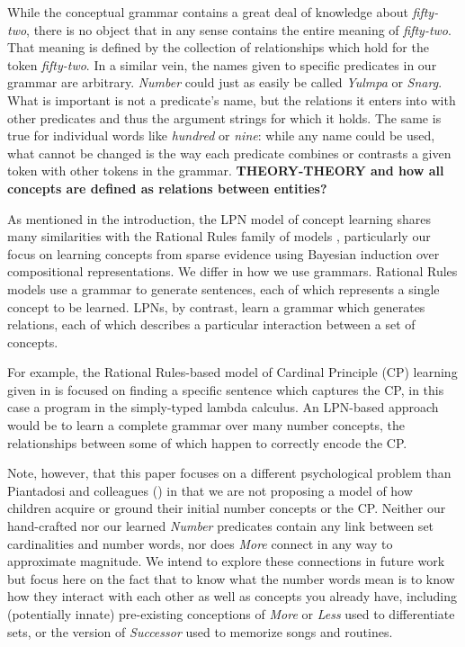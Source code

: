 \documentclass[10pt,letterpaper]{article}
\begin{document}



While the conceptual grammar contains a great deal of knowledge about
\emph{fifty-two}, there is no object that in any sense contains the
entire meaning of \emph{fifty-two}. That meaning is defined by the
collection of relationships which hold for the token \emph{fifty-two}.
In a similar vein, the names given to specific predicates in our
grammar are arbitrary. \emph{Number} could just as easily be called
\emph{Yulmpa} or \emph{Snarg}. What is important is not a predicate's
name, but the relations it enters into with other predicates and thus
the argument strings for which it holds. The same is true for
individual words like \emph{hundred} or \emph{nine}: while any name
could be used, what cannot be changed is the way each predicate
combines or contrasts a given token with other tokens in the grammar.
{\bf THEORY-THEORY and how all concepts are defined as relations
  between entities?}

As mentioned in the introduction, the LPN model of concept learning
shares many similarities with the Rational Rules family of models
\citep{goodman2008rational,T.D.Ullman:2012:1b1b6,PianGoodTen2012},
particularly our focus on learning concepts from sparse evidence using
Bayesian induction over compositional representations. We differ in
how we use grammars. Rational Rules models use a grammar to generate
sentences, each of which represents a single concept to be learned.
LPNs, by contrast, learn a grammar which generates relations, each of
which describes a particular interaction between a set of concepts.

For example, the Rational Rules-based model of Cardinal Principle (CP)
learning given in \citep{PianGoodTen2012} is focused on finding a
specific sentence which captures the CP, in this case a program in the
simply-typed lambda calculus. An LPN-based approach would be to learn
a complete grammar over many number concepts, the relationships
between some of which happen to correctly encode the CP.

Note, however, that this paper focuses on a different psychological
problem than Piantadosi and colleagues (\citeyear{PianGoodTen2012}) in
that we are not proposing a model of how children acquire or ground
their initial number concepts or the CP. Neither our hand-crafted nor
our learned \emph{Number} predicates contain any link between set
cardinalities and number words, nor does \emph{More} connect in any
way to approximate magnitude. We intend to explore these connections
in future work but focus here on the fact that to know what the number
words mean is to know how they interact with each other as well as
concepts you already have, including (potentially innate) pre-existing
conceptions of \emph{More} or \emph{Less} used to differentiate sets,
or the version of \emph{Successor} used to memorize songs and
routines.
\end{document}
